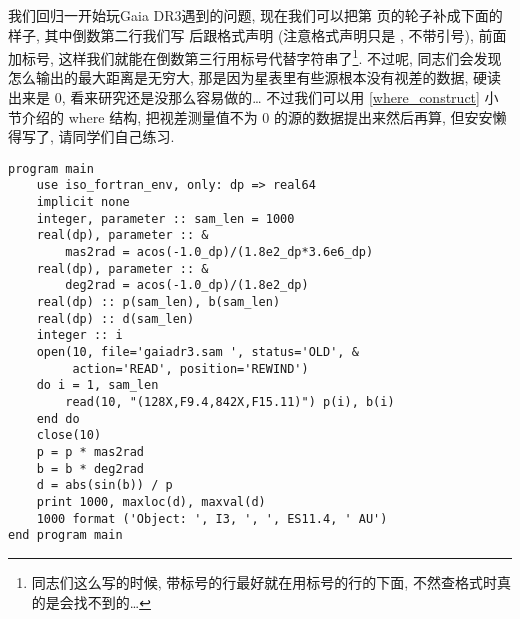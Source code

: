 我们回归一开始玩Gaia DR3遇到的问题, 现在我们可以把第 \pageref{gaiadr3.sam} 页的轮子补成下面的样子, 其中倒数第二行我们写  后跟格式声明 (注意格式声明只是 , 不带引号), 前面加标号, 这样我们就能在倒数第三行用标号代替字符串了\footnote{同志们这么写的时候, 带标号的行最好就在用标号的行的下面, 不然查格式时真的是会找不到的\dots{}}. 不过呢, 同志们会发现怎么输出的最大距离是无穷大, 那是因为星表里有些源根本没有视差的数据, 硬读出来是 $ 0 $, 看来研究还是没那么容易做的\dots{} 不过我们可以用 \ref{where_construct} 小节介绍的 where 结构, 把视差测量值不为 $0$ 的源的数据提出来然后再算, 但安安懒得写了, 请同学们自己练习.
\begin{lstlisting}
program main
    use iso_fortran_env, only: dp => real64
    implicit none
    integer, parameter :: sam_len = 1000
    real(dp), parameter :: &
        mas2rad = acos(-1.0_dp)/(1.8e2_dp*3.6e6_dp)
    real(dp), parameter :: &
        deg2rad = acos(-1.0_dp)/(1.8e2_dp)
    real(dp) :: p(sam_len), b(sam_len)
    real(dp) :: d(sam_len)
    integer :: i
    open(10, file='gaiadr3.sam ', status='OLD', &
         action='READ', position='REWIND')
    do i = 1, sam_len
        read(10, "(128X,F9.4,842X,F15.11)") p(i), b(i)
    end do
    close(10)
    p = p * mas2rad
    b = b * deg2rad
    d = abs(sin(b)) / p
    print 1000, maxloc(d), maxval(d)
    1000 format ('Object: ', I3, ', ', ES11.4, ' AU')
end program main
\end{lstlisting}

